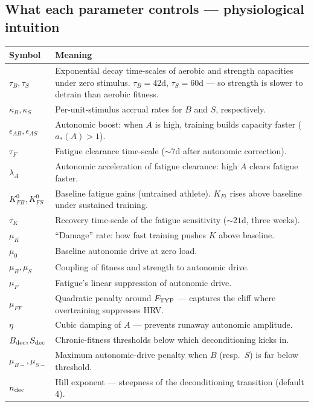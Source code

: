 \documentclass[11pt,a4paper]{article}
\theoremstyle{definition}
\begin{document}
\subsection{What each parameter controls --- physiological intuition}

\begin{center}\small
\begin{tabular}{lp{12cm}}
\toprule
Symbol & Meaning \\
\midrule
$\tau_B, \tau_S$ & Exponential decay time-scales of aerobic and strength capacities under zero stimulus. $\tau_B = 42$d, $\tau_S = 60$d --- so strength is slower to detrain than aerobic fitness. \\
$\kappa_B, \kappa_S$ & Per-unit-stimulus accrual rates for $B$ and $S$, respectively. \\
$\epsilon_{AB}, \epsilon_{AS}$ & Autonomic boost: when $A$ is high, training builds capacity faster ($a_*(A) > 1$). \\
$\tau_F$ & Fatigue clearance time-scale ($\sim 7$d after autonomic correction). \\
$\lambda_A$ & Autonomic acceleration of fatigue clearance: high $A$ clears fatigue faster. \\
$K_{FB}^0, K_{FS}^0$ & Baseline fatigue gains (untrained athlete). $K_{Fi}$ rises above baseline under sustained training. \\
$\tau_K$ & Recovery time-scale of the fatigue sensitivity ($\sim 21$d, three weeks). \\
$\mu_K$ & ``Damage'' rate: how fast training pushes $K$ above baseline. \\
$\mu_0$ & Baseline autonomic drive at zero load. \\
$\mu_B, \mu_S$ & Coupling of fitness and strength to autonomic drive. \\
$\mu_F$ & Fatigue's linear suppression of autonomic drive. \\
$\mu_{FF}$ & Quadratic penalty around $F_{\rm TYP}$ --- captures the cliff where overtraining suppresses HRV. \\
$\eta$ & Cubic damping of $A$ --- prevents runaway autonomic amplitude. \\
\midrule
$B_{\rm dec}, S_{\rm dec}$ & Chronic-fitness thresholds below which deconditioning kicks in. \\
$\mu_{B-}, \mu_{S-}$ & Maximum autonomic-drive penalty when $B$ (resp.\ $S$) is far below threshold. \\
$n_{\rm dec}$ & Hill exponent --- steepness of the deconditioning transition (default 4). \\
\bottomrule
\end{tabular}
\end{center}
\end{document}
